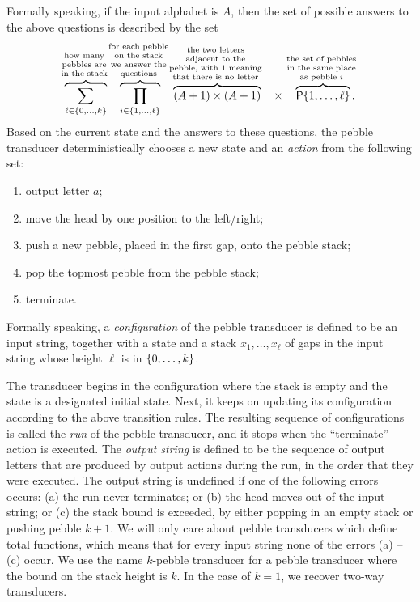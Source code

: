 Formally speaking, if the input alphabet is $A$, then  the set of possible answers to the above questions is described by the set
\begin{align*}
\myoverbrace{\sum_{\ell \in \set{0,\ldots,k}}}{how many \\ pebbles are \\ in the stack} \quad 
\myoverbrace{\prod_{i \in \set{1,\ldots,\ell}}}{for each pebble \\ on the stack \\ we answer the \\ questions} 
\quad 
\myoverbrace{(A+1) \times (A+1)}{the two letters \\ adjacent to the \\ pebble, with $1$ meaning \\ that there is no letter} \quad \times \quad 
\myoverbrace{\powerset \set{1,\ldots,\ell}}{the set of pebbles \\ in the same  place \\  as  pebble $i$}.
\end{align*}
Based on the  current state and the answers to these questions, the pebble transducer deterministically chooses a new state and an \emph{action} from the following set:
\begin{enumerate}
    \item \label{pebble-action:output} output letter $a$; 
    \item \label{pebble-action:move} move the head by one position to the left/right;
    \item \label{pebble-action:push} push a new pebble, placed in the first gap, onto the pebble stack;
    \item \label{pebble-action:pop} pop the topmost pebble from the pebble stack;
    \item \label{pebble-action:terminate} terminate.
\end{enumerate}
Formally speaking,
a \emph{configuration} of the pebble transducer is defined to be  an input string, together with a state and a stack $x_1,\ldots,x_\ell$ of  gaps in the input string whose height $\ell$ is in $\{0,\ldots,k\}$. 


The transducer begins in the configuration where the stack is empty and  the state is a  designated initial state. Next, it keeps on updating its configuration according to the above transition rules. The resulting sequence of configurations is called the \emph{run} of the pebble transducer, and it stops when the ``terminate'' action is executed. The \emph{output string} is defined to be the sequence of output letters that are produced by output actions during the run,  in the order that they were executed.  The output string is undefined if one of the following errors occurs: (a) the run never terminates; or (b) the head moves out of the input string; or (c) the stack bound is exceeded, by either popping in an empty stack or pushing pebble $k+1$. We will only care about pebble transducers which define total functions, which means that for every input string none of the errors (a) -- (c)  occur. 
We use the name $k$-pebble transducer for a pebble transducer where the bound on the stack height is $k$. In the case of $k=1$, 
    we recover  two-way transducers.

